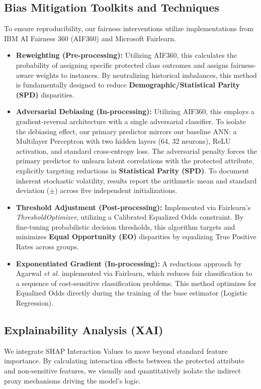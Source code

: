 \documentclass[conference]{IEEEtran}
\begin{document}
\subsection{Bias Mitigation Toolkits and Techniques}
To ensure reproducibility, our fairness interventions utilize implementations from IBM AI Fairness 360 (AIF360) and Microsoft Fairlearn.
\begin{itemize}
    \item \textbf{Reweighting (Pre-processing):} Utilizing AIF360, this calculates the probability of assigning specific protected class outcomes and assigns fairness-aware weights to instances. By neutralizing historical imbalances, this method is fundamentally designed to reduce \textbf{Demographic/Statistical Parity (SPD)} disparities.
    \item \textbf{Adversarial Debiasing (In-processing):} Utilizing AIF360, this employs a gradient-reversal architecture with a single adversarial classifier. To isolate the debiasing effect, our primary predictor mirrors our baseline ANN: a Multilayer Perceptron with two hidden layers (64, 32 neurons), ReLU activation, and standard cross-entropy loss. The adversarial penalty forces the primary predictor to unlearn latent correlations with the protected attribute, explicitly targeting reductions in \textbf{Statistical Parity (SPD)}. To document inherent stochastic volatility, results report the arithmetic mean and standard deviation ($\pm$) across five independent initializations.
    \item \textbf{Threshold Adjustment (Post-processing):} Implemented via Fairlearn's \textit{ThresholdOptimizer}, utilizing a Calibrated Equalized Odds constraint. By fine-tuning probabilistic decision thresholds, this algorithm targets and minimizes \textbf{Equal Opportunity (EO)} disparities by equalizing True Positive Rates across groups.
    
    \item \textbf{Exponentiated Gradient (In-processing):} A reductions approach by Agarwal \textit{et al.} \cite{R12} implemented via Fairlearn, which reduces fair classification to a sequence of cost-sensitive classification problems. This method optimizes for Equalized Odds directly during the training of the base estimator (Logistic Regression).
\end{itemize}

\subsection{Explainability Analysis (XAI)}
We integrate SHAP Interaction Values to move beyond standard feature importance. By calculating interaction effects between the protected attribute and non-sensitive features, we visually and quantitatively isolate the indirect proxy mechanisms driving the model's logic.
\end{document}
